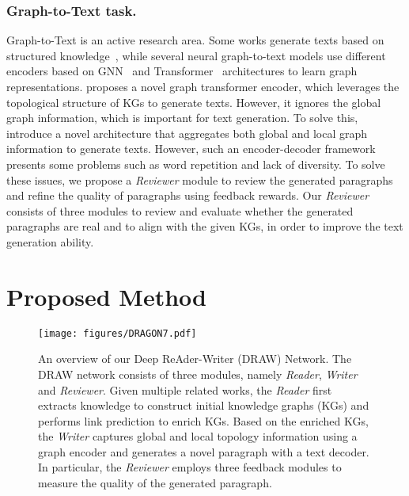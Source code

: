 \documentclass[letterpaper]{article}
\begin{document}
\subsubsection{Graph-to-Text task.} 
Graph-to-Text is an active research area. Some works generate texts based on structured knowledge~\cite{GTR-LSTM, SQLtoTextGW, nie-etal-2018-operation}, while several neural graph-to-text models use different encoders based on GNN~\cite{inproceedings,Guo,Huang2020Location} and Transformer~\cite{Vaswani2017AttentionIA} architectures to learn graph representations. \citeauthor{KoncelKedziorski2019TextGF} proposes a novel graph transformer encoder, {which} leverages the topological structure of KGs to generate texts. 
However, it ignores the global graph information, which is important for text generation. 
To solve this, \citeauthor{ribeiro2020modeling} introduce a novel architecture that aggregates both global and local graph information to generate texts. 
However, such an encoder-decoder framework presents some problems such as word repetition and lack of diversity. 
To solve these issues, we propose a \textit{Reviewer} module to review the generated paragraphs and refine the quality of paragraphs using feedback rewards.
Our \textit{Reviewer} consists of three modules to review and evaluate whether the generated paragraphs are real and to align with the given KGs, in order to improve the text generation ability.

\section{Proposed Method}

\begin{figure*}[t]
\centering
{
\texttt{[image: figures/DRAGON7.pdf]}
\caption{An overview of our Deep ReAder-Writer (DRAW) Network. The DRAW network consists of three modules, namely \textit{Reader}, \textit{Writer} and \textit{Reviewer}. Given multiple related works, the \textit{Reader} first extracts knowledge to construct initial knowledge graphs (KGs) and performs link prediction to enrich KGs. Based on the enriched KGs, the \textit{Writer} captures global and local topology information using a graph encoder and generates a novel paragraph with a text decoder. In particular, the \textit{Reviewer} employs three feedback modules to measure the quality of the generated paragraph.}
\label{fig:overview_framework}
}
\end{figure*}
\end{document}

